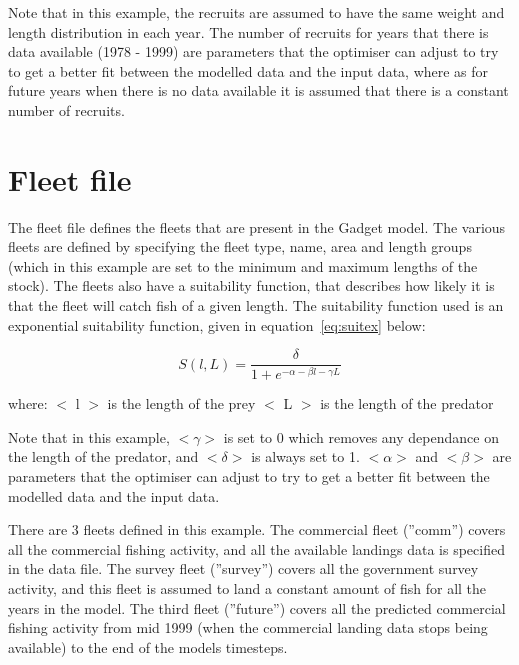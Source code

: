 \documentclass[10pt,titlepage]{article}
\begin{document}
Note that in this example, the recruits are assumed to have the same weight and length distribution in each year.  The number of recruits for years that there is data available (1978 - 1999) are parameters that the optimiser can adjust to try to get a better fit between the modelled data and the input data, where as for future years when there is no data available it is assumed that there is a constant number of recruits.

{\small }

\section{Fleet file}

The fleet file defines the fleets that are present in the Gadget model.  The various fleets are defined by specifying the fleet type, name, area and length groups (which in this example are set to the minimum and maximum lengths of the stock).  The fleets also have a suitability function, that describes how likely it is that the fleet will catch fish of a given length.  The suitability function used is an exponential suitability function, given in equation~\ref{eq:suitex} below:

\begin{equation}\label{eq:suitex}
S(l,L) = { \frac{\delta}{1 + e^{- \alpha - \beta l - \gamma  L}}}
\end{equation}

where:\newline
$<$ l $>$ is the length of the prey\newline
$<$ L $>$ is the length of the predator

\bigskip
Note that in this example, $<\gamma>$ is set to 0 which removes any dependance on the length of the predator, and $<\delta>$ is always set to 1.   $<\alpha>$ and $<\beta>$ are parameters that the optimiser can adjust to try to get a better fit between the modelled data and the input data.

\bigskip
There are 3 fleets defined in this example.  The commercial fleet (''comm'') covers all the commercial fishing activity, and all the available landings data is specified in the data file.  The survey fleet (''survey'') covers all the government survey activity, and this fleet is assumed to land a constant amount of fish for all the years in the model.  The third fleet (''future'') covers all the predicted commercial fishing activity from mid 1999 (when the commercial landing data stops being available) to the end of the models timesteps.
\end{document}

